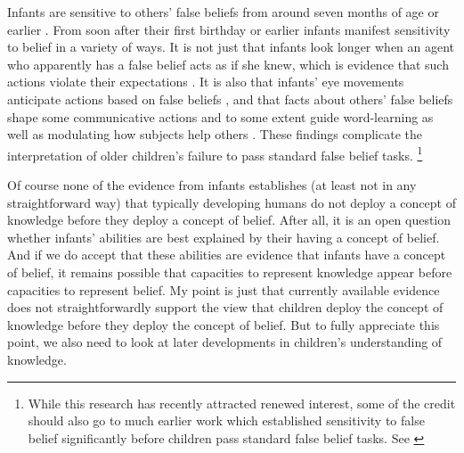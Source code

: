 \documentclass[11pt,a4paper]{extarticle}
\begin{document}
Infants are sensitive to others' false beliefs from around seven months of age or earlier \citep{kovacs_social_2010}.
From soon after their first birthday or earlier infants manifest sensitivity to belief in a variety of ways.
It is not just that infants look longer when an agent who apparently has a false belief acts as if she knew, which is evidence that such actions violate their expectations  \citep{Onishi:2005hm,Surian:2007hl}.
It is also that infants' eye movements anticipate actions based on false beliefs \citep{Southgate:2007js},
and that facts about others' false beliefs shape some communicative actions \citep{Knudsen:2011fk} and to some extent guide word-learning \citep{Carpenter:2002gc} as well as modulating how subjects help others \citep{Buttelmann:2009gy}.
These findings complicate the interpretation of older children's failure to pass standard false belief tasks.%
\footnote{
While this research has recently attracted renewed interest, some of the credit should also go to much earlier work which established sensitivity to false belief significantly before children pass standard false belief tasks. 
See \citet{Clements:1994cw,Garnham:2001jm,Garnham:2001ql,Ruffman:2001ng}
}



Of course none of the evidence from infants
 establishes (at least not in any straightforward way) that typically developing humans do not deploy a concept of knowledge before they deploy a concept of belief.
After all, it is an open question whether infants' abilities are best explained by their having a concept of belief.
And if we do accept that these abilities are evidence that infants have a concept of belief, 
it remains possible that capacities to represent knowledge appear before capacities to represent belief.
My point is just that currently available evidence does not straightforwardly support the view that children deploy the concept of knowledge before they deploy the concept of belief.
But to fully appreciate this point, we also need to look at later developments in children's understanding of knowledge.
\end{document}
